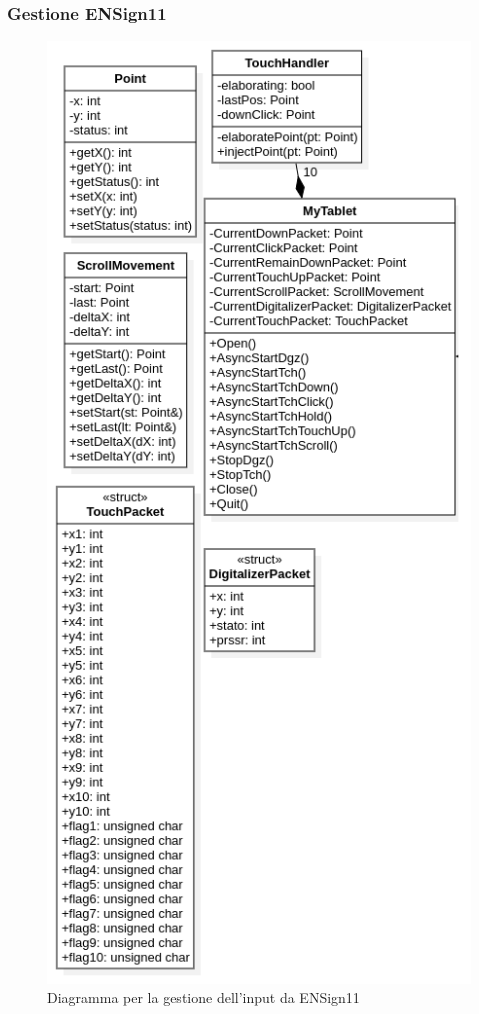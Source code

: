 \subsubsection{Gestione ENSign11}
\begin{figure}[h]
    \centering
    \includegraphics[width=340pt]{images/prog/ENS11.png}
    \caption{Diagramma per la gestione dell'input da ENSign11}
    \label{fig:es11}
\end{figure}
